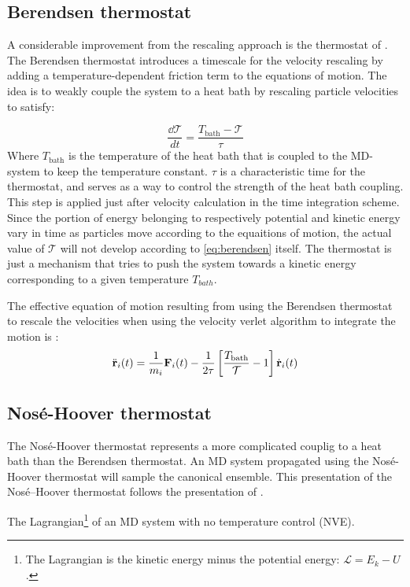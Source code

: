 \subsection{Berendsen thermostat}
A considerable improvement from the rescaling approach is the thermostat of \citet{Berendsen1984}. The Berendsen thermostat introduces a timescale for the velocity rescaling by adding a temperature-dependent friction term to the equations of motion. The idea is to weakly couple the system to a heat bath by rescaling particle velocities to satisfy:

\begin{equation}
\frac{\dd \mathcal{T}}{dt} = \frac{T_{\text{bath}}-\mathcal{T}}{\tau}
\label{eq:berendsen}
\end{equation}
Where $T_{\text{bath}}$ is the temperature of the heat bath that is coupled to the MD-system to keep the temperature constant. $\tau$ is a characteristic time for the thermostat, and serves as a way to control the strength of the heat bath coupling. This step is applied just after velocity calculation in the time integration scheme. Since the portion of energy belonging to respectively potential and kinetic energy vary in time as particles move according to the equaitions of motion, the actual value of $\mathcal{T}$ will not develop according to \ref{eq:berendsen} itself. The thermostat is just a mechanism that tries to push the system towards a kinetic energy corresponding to a given temperature $T_{bath}$.

The effective equation of motion resulting from using the Berendsen thermostat to rescale the velocities when using the velocity verlet algorithm to integrate the motion is \cite[p.128]{Hunenberger2005}:
\begin{equation}
	\ddot{\mathbf{r}}_i(t) = \frac{1}{m_i} \mathbf{F}_i(t) - \frac{1}{2\tau}\left[ \frac{T_{\text{bath}}}{\mathcal{T}} -1 \right] \dot{\mathbf{r}}_i(t)
\end{equation} 

\subsection{Nosé-Hoover thermostat}
The Nosé-Hoover thermostat represents a more complicated couplig to a heat bath than the Berendsen thermostat. An MD system propagated using the Nosé-Hoover thermostat will sample the canonical ensemble. This presentation of the Nosé--Hoover thermostat follows the presentation of \citet{Hunenberger2005}.


The Lagrangian\footnote{The Lagrangian is the kinetic energy minus the potential energy: $\mathcal{L}=E_k - U$.} of an MD system with no temperature control (NVE).

